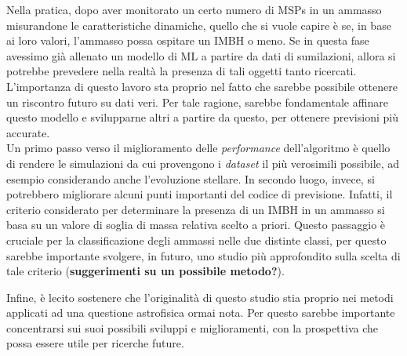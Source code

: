 Nella pratica, dopo aver monitorato un certo numero di MSPs in un ammasso misurandone le caratteristiche dinamiche, quello che si vuole capire è se, in base ai loro valori, l'ammasso possa ospitare un IMBH o meno. Se in questa fase avessimo già allenato un modello di ML a partire da dati di sumilazioni, allora si potrebbe prevedere nella realtà la presenza di tali oggetti tanto ricercati.\\ L'importanza di questo lavoro sta proprio nel fatto che sarebbe possibile ottenere un riscontro futuro su dati veri. Per tale ragione, sarebbe fondamentale affinare questo modello e svilupparne altri a partire da questo, per ottenere previsioni più accurate.\\
Un primo passo verso il miglioramento delle \textit{performance} dell'algoritmo è quello di rendere le simulazioni da cui provengono i \textit{dataset} il più verosimili possibile, ad esempio considerando anche l'evoluzione stellare. In secondo luogo, invece, si potrebbero migliorare alcuni punti importanti del codice di previsione. Infatti, il criterio considerato per determinare la presenza di un IMBH in un ammasso si basa su un valore di soglia di massa relativa scelto a priori. Questo passaggio è cruciale per la classificazione degli ammassi nelle due distinte classi, per questo sarebbe importante svolgere, in futuro, uno studio più approfondito sulla scelta di tale criterio (\textbf{suggerimenti su un possibile metodo?}).

Infine, è lecito sostenere che l'originalità di questo studio stia proprio nei metodi applicati ad una questione astrofisica ormai nota. Per questo sarebbe importante concentrarsi sui suoi possibili sviluppi e miglioramenti, con la prospettiva che possa essere utile per ricerche future.
